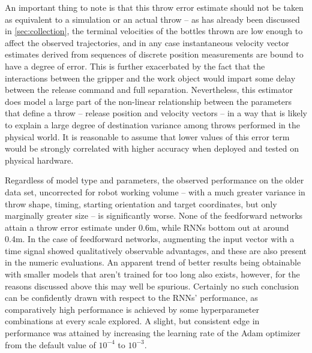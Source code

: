 \documentclass{article}
\begin{document}
An important thing to note is that this throw error estimate should not be taken as equivalent to a simulation or an actual throw -- as has already been discussed in \ref{sec:collection}, the terminal velocities of the bottles thrown are low enough to affect the observed trajectories, and in any case instantaneous velocity vector estimates derived from sequences of discrete position measurements are bound to have a degree of error. This is further exacerbated by the fact that the interactions between the gripper and the work object would impart some delay between the release command and full separation. Nevertheless, this estimator does model a large part of the non-linear relationship between the parameters that define a throw -- release position and velocity vectors -- in a way that is likely to explain a large degree of destination variance among throws performed in the physical world. It is reasonable to assume that lower values of this error term would be strongly correlated with higher accuracy when deployed and tested on physical hardware.

Regardless of model type and parameters, the observed performance on the older data set, uncorrected for robot working volume -- with a much greater variance in throw shape, timing, starting orientation and target coordinates, but only marginally greater size -- is significantly worse. None of the feedforward networks attain a throw error estimate under 0.6m, while RNNs bottom out at around 0.4m. In the case of feedforward networks, augmenting the input vector with a time signal showed qualitatively observable advantages, and these are also present in the numeric evaluations. An apparent trend of better results being obtainable with smaller models that aren't trained for too long also exists, however, for the reasons discussed above this may well be spurious. Certainly no such conclusion can be confidently drawn with respect to the RNNs' performance, as comparatively high performance is achieved by some hyperparameter combinations at every scale explored. A slight, but consistent edge in performance was attained by increasing the learning rate of the Adam optimizer from the default value of $10^{-4}$ to $10^{-3}$.
\end{document}
